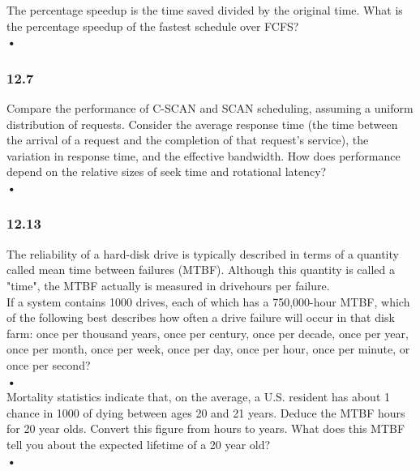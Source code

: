 \documentclass[a4paper,10pt,titlepage]{report}
\begin{document}
	
	
\hspace{10mm} 	The percentage speedup is the time saved divided by the original time. What is the percentage speedup of the fastest schedule over FCFS? \\
\hspace{15mm} \textbf{•} \\





\subsubsection{12.7} Compare the performance of C-SCAN and SCAN scheduling, assuming a uniform distribution of requests. Consider the average response time (the time between the arrival of a request and the completion of that request's service), the variation in response time, and the effective bandwidth. How does performance depend on the relative sizes of seek time and rotational latency? \\
\hspace{15mm} \textbf{•} \\




\subsubsection{12.13} The reliability of a hard-disk drive is typically described in terms of a quantity called mean time between failures (MTBF). Although this quantity is called a "time", the MTBF actually is measured in drivehours per failure. \\
\hspace{10mm} 	If a system contains 1000 drives, each of which has a 750,000-hour MTBF, which of the following best describes how often a drive failure will occur in that disk farm: once per thousand years, once per century, once per decade, once per year, once per month, once per week, once per day, once per hour, once per minute, or once per second? \\
\hspace{15mm} \textbf{•} \\

\hspace{10mm} 	Mortality statistics indicate that, on the average, a U.S. resident has about 1 chance in 1000 of dying between ages 20 and 21 years. Deduce the MTBF hours for 20 year olds. Convert this figure from hours to years. What does this MTBF tell you about the expected lifetime of a 20 year old? \\
\hspace{15mm} \textbf{•} \\
\end{document}
